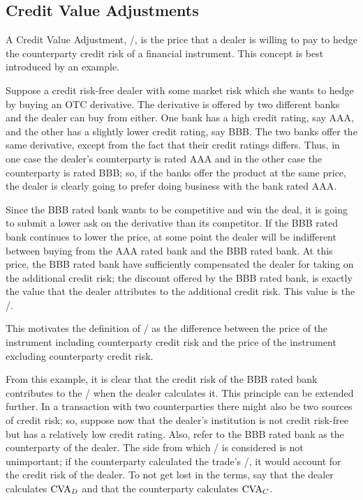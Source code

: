 \documentclass[main.tex]{subfiles}
\begin{document}
    \subsection{Credit Value Adjustments}
        A Credit Value Adjustment, \CVA/, is the price that a dealer is willing to pay 
        to hedge the counterparty credit risk of a financial instrument.
        This concept is best introduced by an example. 
        
        \begin{example}
        Suppose a credit risk-free dealer with some market risk 
        which she wants to hedge by buying an OTC derivative.
        The derivative is offered by two different banks and the dealer can buy from either.
        One bank has a high credit rating, say AAA, and the other has a slightly lower credit rating, say BBB. 
        The two banks offer the same derivative, except from the fact that their credit ratings differs.
        Thus, in one case the dealer's counterparty is rated AAA and in the other case the counterparty is rated BBB;
        so, if the banks offer the product at the same price, 
        the dealer is clearly going to prefer doing business with the bank rated AAA.

        Since the BBB rated bank wants to be competitive and win the deal,
        it is going to submit a lower ask on the derivative than its competitor.
        If the BBB rated bank continues to lower the price, 
        at some point the dealer will be indifferent between buying 
        from the AAA rated bank and the BBB rated bank.
        At this price, the BBB rated bank have sufficiently compensated the dealer for taking on the additional credit risk;
        the discount offered by the BBB rated bank, 
        is exactly the value that the dealer attributes to the additional credit risk. 
        This value is the \CVA/.

        This motivates the definition of \CVA/ as the difference between the price of the instrument 
        including counterparty credit risk and the price of the instrument excluding counterparty credit risk.
        \end{example}

        From this example, it is clear that the credit risk of the BBB rated bank contributes to the \CVA/
        when the dealer calculates it.
        This principle can be extended further.
        In a transaction with two counterparties there might also be two sources of credit risk;
        so, suppose now that the dealer's institution is not credit risk-free 
        but has a relatively low credit rating.
        Also, refer to the BBB rated bank as the counterparty of the dealer.
        The side from which \CVA/ is considered is not unimportant;
        if the counterparty calculated the trade's \CVA/, it would account for the credit risk of the dealer.
        To not get lost in the terms, say that the dealer calculates $\CVA/_{D}$ 
        and that the counterparty calculates $\CVA/_{C}$.
\end{document}
